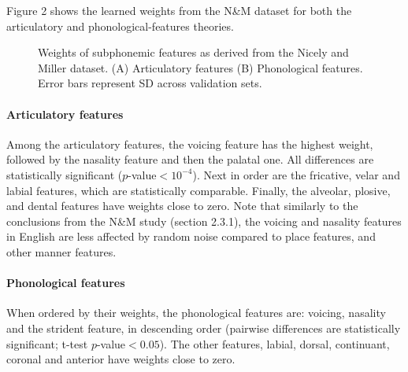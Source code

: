Figure 2 shows the learned weights from the N\&M dataset for both the articulatory and phonological-features theories.

\begin{figure}[H]
\caption{Weights of subphonemic features as derived from the Nicely and Miller dataset. (A) Articulatory features (B) Phonological features. Error bars represent SD across validation sets.}
\end{figure}

\paragraph{Articulatory features} Among the articulatory features, the voicing feature has the highest weight, followed by the nasality feature and then the palatal one. All differences are statistically significant ($p$-value$<10^{-4}$). Next in order are the fricative, velar and labial features, which are statistically comparable. Finally, the alveolar, plosive, and dental features have weights close to zero. Note that similarly to the conclusions from the N\&M study (section 2.3.1), the voicing and nasality features in English are less affected by random noise compared to place features, and other manner features.

\paragraph{Phonological features} When ordered by their weights, the phonological features are: voicing, nasality and the strident feature, in descending order (pairwise differences are statistically significant; t-test $p$-value$<0.05$). The other features, labial, dorsal, continuant, coronal and anterior have weights close to zero. 

